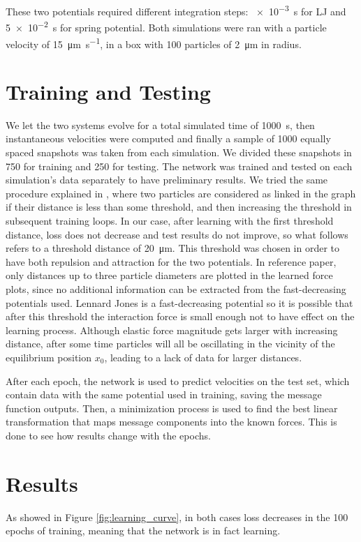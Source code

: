 \documentclass[../../master_thesis_np.tex]{subfiles}
\begin{document}
These two potentials required different integration steps: \SI{e-3}{\second} for LJ and \SI{5e-2}{\second} for spring potential.
Both simulations were ran with a particle velocity of \SI{15}{\um \per \second}, in a  box with \num{100} particles of \SI{2}{\um} in radius.

\section{Training and Testing}

We let the two systems evolve for a total simulated time of \SI{1000}{\second}, then instantaneous velocities were computed and finally a sample of \num{1000} equally spaced snapshots was taken from each simulation.
We divided these snapshots in \num{750} for training and \num{250} for testing.
The network was trained and tested on each simulation's data separately to have preliminary results.
We tried the same procedure explained in \cite{ruiz-garcia_discovering_2024}, where two particles are considered as linked in the graph if their distance is less than some threshold, and then increasing the threshold in subsequent training loops.
In our case, after learning with the first threshold distance, loss does not decrease and test results do not improve, so what follows refers to a threshold distance of \SI{20}{\um}.
This threshold was chosen in order to have both repulsion and attraction for the two potentials.
In reference paper, only distances up to three particle diameters are plotted in the learned force plots, since no additional information can be extracted from the fast-decreasing potentials \citeauthor{ruiz-garcia_discovering_2024} used.
Lennard Jones is a fast-decreasing potential so it is possible that after this threshold the interaction force is small enough not to have effect on the learning process.
Although elastic force magnitude gets larger with increasing distance, after some time particles will all be oscillating in the vicinity of the equilibrium position $x_0$, leading to a lack of data for larger distances.

After each epoch, the network is used to predict velocities on the test set, which contain data with the same potential used in training, saving the message function outputs.
Then, a minimization process is used to find the best linear transformation that maps message components into the known forces.
This is done to see how results change with the epochs.

\section{Results} \label{4results}
As showed in Figure \ref{fig:learning_curve}, in both cases loss decreases in the 100 epochs of training, meaning that the network is in fact learning.
\end{document}
